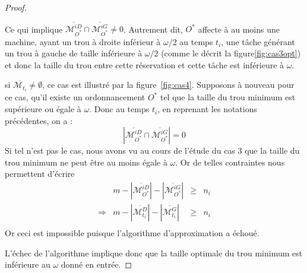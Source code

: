 \documentclass[a4paper,9pt]{article}
\begin{document}
\begin{proof}
\begin{bitemize}
\begin{enumerate}
                    Ce qui implique $\overline{\mathcal{M}_{O^*}^{iD}} \cap
                    \overline{\mathcal{M}_{O^*}^{iG}} \neq 0$. Autrement dit, $O^*$ affecte à au
                    moins une machine, ayant un trou à droite inférieur à $\omega / 2$ au temps
                    $t_i$, une tâche générant un trou à gauche de taille inférieure à $\omega / 2$
                    (comme le décrit la figure\ref{fig:cas3opt})
                    et donc la taille du trou entre cette réservation et cette tâche est inférieure à
                    $\omega$.
            \end{enumerate}
        \item si $\overline{\mathcal{M}_{t_i}} \neq \emptyset$, ce cas est illustré par la
            figure~\ref{fig:cas4}. Supposons à nouveau pour ce cas, qu'il existe un ordonnancement
            $O^*$ tel que la taille du trou minimum est supérieure ou égale à $\omega$. Donc au
            temps $t_i$, en reprenant les notations précédentes, on a :
            \begin{displaymath}
                |\overline{\mathcal{M}_{O^*}^{iD}} \cap \overline{\mathcal{M}_{O^*}^{iG}}| = 0
            \end{displaymath}
            Si tel n'est pas le cas, nous avons vu au cours de l'étude du cas $3$ que la taille
            du trou minimum ne peut être au moins égale à $\omega$. Or de telles contraintes nous
            permettent d'écrire
            \begin{displaymath}
                \begin{array}{rrcl}
                    & m - |\overline{\mathcal{M}_{O^*}^{iD}}| -
                    |\overline{\mathcal{M}_{O^*}^{iG}}| & \geq & n_i \\
                    \Rightarrow & m - |\overline{\mathcal{M}_{t_i}^D}| -
                    |\overline{\mathcal{M}_{t_i}^G}| & \geq & n_i \\
                \end{array}
            \end{displaymath}
            Or ceci est impossible puisque l'algorithme d'approximation a échoué.
    \end{bitemize}

    L'échec de l'algorithme implique donc que la taille optimale du trou minimum est inférieure au
    $\omega$ donné en entrée.
\end{proof}
\end{document}

